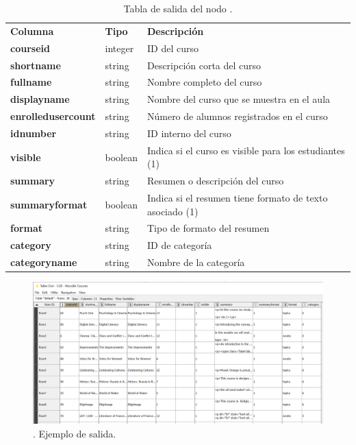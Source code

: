 \begin{table}[!h]
	\begin{center}
		\begin{tabular}{p{}p{}p{}}
			\toprule
			\textbf{Columna} & \textbf{Tipo} & \textbf{Descripción}\\
			\otoprule
			\textbf{courseid} & integer & ID del curso \\
         \hline
			\textbf{shortname} & string & Descripción corta del curso \\
         \hline
         \textbf{fullname} & string & Nombre completo del curso \\
         \hline
         \textbf{displayname} & string & Nombre del curso que se muestra en el aula \\
         \hline
         \textbf{enrolledusercount} & string & Número de alumnos registrados en el curso \\
         \hline
         \textbf{idnumber} & string & ID interno del curso \\
         \hline
         \textbf{visible} & boolean & Indica si el curso es visible para los estudiantes (1) \\
         \hline
         \textbf{summary} & string & Resumen o descripción del curso\\
         \hline
         \textbf{summaryformat} & boolean & Indica si el resumen tiene formato de texto asociado (1) \\
         \hline
         \textbf{format} & string & Tipo de formato del resumen \\
         \hline
         \textbf{category} & string & ID de categoría \\
         \hline
         \textbf{categoryname} & string & Nombre de la categoría \\
			\bottomrule
		\end{tabular}
	\end{center}
	\caption{Tabla de salida del nodo .}
	\label{tab:moodle_courses_desc}
\end{table}
\FloatBarrier


\begin{figure}[!h]
	\centering
	\includegraphics[width=1\textwidth]{img/nodes_moodle_courses_output.png}
	\caption{. Ejemplo de salida.}
	\label{fig:moodlecourses_output}
\end{figure}
\FloatBarrier
\hphantom{ }


